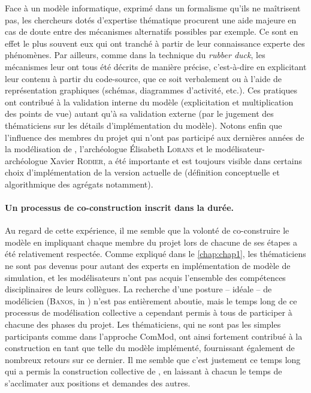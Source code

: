 Face à un modèle informatique, exprimé dans un formalisme qu'ils ne maîtrisent pas, les chercheurs dotés d'expertise thématique procurent une aide majeure en cas de doute entre des mécanismes alternatifs possibles par exemple.
Ce sont en effet le plus souvent eux qui ont tranché à partir de leur connaissance experte des phénomènes.
Par ailleurs, comme dans la technique du \textit{rubber duck}, les mécanismes leur ont tous été décrits de manière précise, c'est-à-dire en explicitant leur contenu à partir du code-source, que ce soit verbalement ou à l'aide de représentation graphiques (schémas, diagrammes d'activité, etc.).
Ces pratiques ont contribué à la validation interne du modèle (explicitation et multiplication des points de vue) autant qu'à sa validation externe (par le jugement des thématiciens sur les détails d'implémentation du modèle).
Notons enfin que l'influence des membres du projet qui n'ont pas participé aux dernières années de la modélisation de \simfeodal{}, l'archéologue Élisabeth \textsc{Lorans} et le \og modélisateur-archéologue\fg{} Xavier \textsc{Rodier}, a été importante et est toujours visible dans certains choix d'implémentation de la version actuelle de \simfeodal{} (définition conceptuelle et algorithmique des agrégats notamment).


\paragraph{Un processus de co-construction inscrit dans la durée.}
Au regard de cette expérience, il me semble que la volonté de co-construire le modèle en impliquant chaque membre du projet lors de chacune de ses étapes a été relativement respectée.
Comme expliqué dans le \cref{chap:chap1}, les \og thématiciens\fg{} ne sont pas devenus pour autant des experts en implémentation de modèle de simulation, et les \og modélisateurs\fg{} n'ont pas acquis l'ensemble des compétences disciplinaires de leurs collègues.
La recherche d'une posture -- idéale -- de \og modélicien\fg{} (\textsc{Banos}, in \cite[484]{ouriachi_lelaboration_2017}) n'est pas entièrement aboutie, mais le temps long de ce processus de modélisation collective a cependant permis à tous de participer à chacune des phases du projet.
Les thématiciens, qui ne sont pas les simples \og participants\fg{} comme dans l'approche ComMod, ont ainsi fortement contribué à la construction en tant que telle du modèle implémenté, fournissant également de nombreux retours sur ce dernier.
Il me semble que c'est justement ce temps long qui a permis la construction collective de \simfeodal{}, en laissant à chacun le temps de s'acclimater aux positions et demandes des autres.


